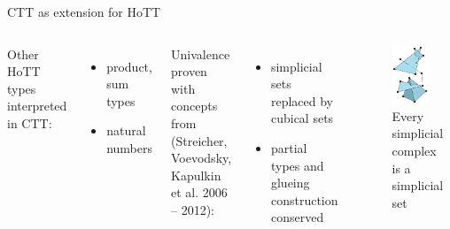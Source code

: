\documentclass[english]{beamer}
\begin{document}
\begin{frame}{CTT as extension for HoTT}{}
 


 \begin{columns}[c]
         Other HoTT types interpreted in CTT:
 \begin{itemize}
  \item product, sum types
  \item natural numbers
 \end{itemize}
 
        Univalence proven with concepts from (Streicher, Voevodsky, Kapulkin et al. 2006 -- 2012):
        \begin{itemize}
        \item simplicial sets replaced by cubical sets
        \item partial types and glueing construction conserved
       \end{itemize}
        \begin{figure}
       \includegraphics[width=0.7\textwidth]{figures/simplex}
       \caption{Every simplicial complex is a simplicial set}
       \end{figure}
\end{columns}
 
\end{frame}
\end{document}
